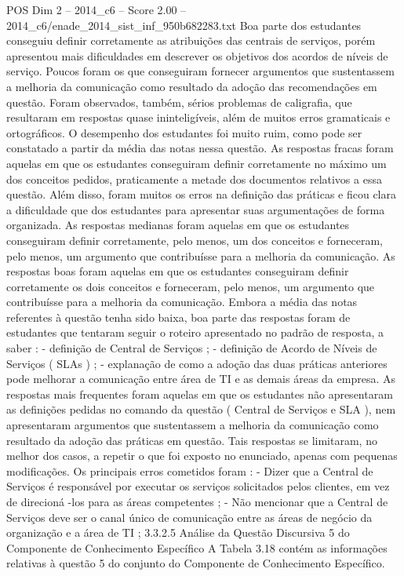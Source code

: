 \begin{textsample}{POS Dim 2 – 2014\_c6 – Score 2.00 – 2014\_c6/enade\_2014\_sist\_inf\_950b682283.txt}
Boa parte dos estudantes conseguiu definir corretamente as atribuições das centrais de serviços, porém apresentou mais dificuldades em descrever os objetivos dos acordos de níveis de serviço.
Poucos foram os que conseguiram fornecer argumentos que sustentassem a melhoria da comunicação como resultado da adoção das recomendações em questão.
Foram observados, também, sérios problemas de caligrafia, que resultaram em respostas quase ininteligíveis, além de muitos erros gramaticais e ortográficos.
O desempenho dos estudantes foi muito ruim, como pode ser constatado a partir da média das notas nessa questão.
As respostas fracas foram aquelas em que os estudantes conseguiram definir corretamente no máximo um dos conceitos pedidos, praticamente a metade dos documentos relativos a essa questão.
Além disso, foram muitos os erros na definição das práticas e ficou clara a dificuldade que dos estudantes para apresentar suas argumentações de forma organizada.
As respostas medianas foram aquelas em que os estudantes conseguiram definir corretamente, pelo menos, um dos conceitos e forneceram, pelo menos, um argumento que contribuísse para a melhoria da comunicação.
As respostas boas foram aquelas em que os estudantes conseguiram definir corretamente os dois conceitos e forneceram, pelo menos, um argumento que contribuísse para a melhoria da comunicação.
Embora a média das notas referentes à questão tenha sido baixa, boa parte das respostas foram de estudantes que tentaram seguir o roteiro apresentado no padrão de resposta, a saber : - definição de Central de Serviços ; - definição de Acordo de Níveis de Serviços ( SLAs ) ; - explanação de como a adoção das duas práticas anteriores pode melhorar a comunicação entre área de TI e as demais áreas da empresa.
As respostas mais frequentes foram aquelas em que os estudantes não apresentaram as definições pedidas no comando da questão ( Central de Serviços e SLA ), nem apresentaram argumentos que sustentassem a melhoria da comunicação como resultado da adoção das práticas em questão.
Tais respostas se limitaram, no melhor dos casos, a repetir o que foi exposto no enunciado, apenas com pequenas modificações.
Os principais erros cometidos foram : - Dizer que a Central de Serviços é responsável por executar os serviços solicitados pelos clientes, em vez de direcioná -los para as áreas competentes ; - Não mencionar que a Central de Serviços deve ser o canal único de comunicação entre as áreas de negócio da organização e a área de TI ; 3.3.2.5 Análise da Questão Discursiva 5 do Componente de Conhecimento Específico A Tabela 3.18 contém as informações relativas à questão 5 do conjunto do Componente de Conhecimento Específico.

\end{textsample}
